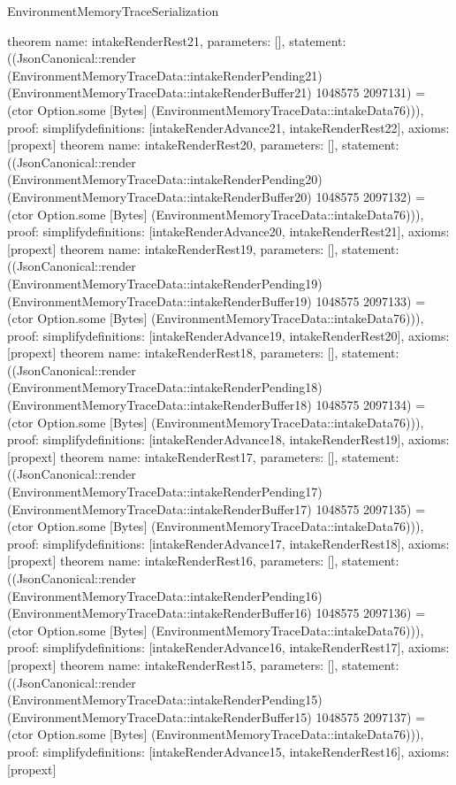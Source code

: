 \begin{lexlean}{EnvironmentMemoryTraceSerialization}
\begin{semanticmodule}
{}
theorem{
 name: intakeRenderRest21, parameters: [],
 statement: ((JsonCanonical::render (EnvironmentMemoryTraceData::intakeRenderPending21) (EnvironmentMemoryTraceData::intakeRenderBuffer21) 1048575 2097131) = (ctor Option.some [Bytes] (EnvironmentMemoryTraceData::intakeData76))), proof: simplify{definitions: [intakeRenderAdvance21, intakeRenderRest22]}, axioms: [propext]
}
theorem{
 name: intakeRenderRest20, parameters: [],
 statement: ((JsonCanonical::render (EnvironmentMemoryTraceData::intakeRenderPending20) (EnvironmentMemoryTraceData::intakeRenderBuffer20) 1048575 2097132) = (ctor Option.some [Bytes] (EnvironmentMemoryTraceData::intakeData76))), proof: simplify{definitions: [intakeRenderAdvance20, intakeRenderRest21]}, axioms: [propext]
}
theorem{
 name: intakeRenderRest19, parameters: [],
 statement: ((JsonCanonical::render (EnvironmentMemoryTraceData::intakeRenderPending19) (EnvironmentMemoryTraceData::intakeRenderBuffer19) 1048575 2097133) = (ctor Option.some [Bytes] (EnvironmentMemoryTraceData::intakeData76))), proof: simplify{definitions: [intakeRenderAdvance19, intakeRenderRest20]}, axioms: [propext]
}
theorem{
 name: intakeRenderRest18, parameters: [],
 statement: ((JsonCanonical::render (EnvironmentMemoryTraceData::intakeRenderPending18) (EnvironmentMemoryTraceData::intakeRenderBuffer18) 1048575 2097134) = (ctor Option.some [Bytes] (EnvironmentMemoryTraceData::intakeData76))), proof: simplify{definitions: [intakeRenderAdvance18, intakeRenderRest19]}, axioms: [propext]
}
theorem{
 name: intakeRenderRest17, parameters: [],
 statement: ((JsonCanonical::render (EnvironmentMemoryTraceData::intakeRenderPending17) (EnvironmentMemoryTraceData::intakeRenderBuffer17) 1048575 2097135) = (ctor Option.some [Bytes] (EnvironmentMemoryTraceData::intakeData76))), proof: simplify{definitions: [intakeRenderAdvance17, intakeRenderRest18]}, axioms: [propext]
}
theorem{
 name: intakeRenderRest16, parameters: [],
 statement: ((JsonCanonical::render (EnvironmentMemoryTraceData::intakeRenderPending16) (EnvironmentMemoryTraceData::intakeRenderBuffer16) 1048575 2097136) = (ctor Option.some [Bytes] (EnvironmentMemoryTraceData::intakeData76))), proof: simplify{definitions: [intakeRenderAdvance16, intakeRenderRest17]}, axioms: [propext]
}
theorem{
 name: intakeRenderRest15, parameters: [],
 statement: ((JsonCanonical::render (EnvironmentMemoryTraceData::intakeRenderPending15) (EnvironmentMemoryTraceData::intakeRenderBuffer15) 1048575 2097137) = (ctor Option.some [Bytes] (EnvironmentMemoryTraceData::intakeData76))), proof: simplify{definitions: [intakeRenderAdvance15, intakeRenderRest16]}, axioms: [propext]
}
\end{semanticmodule}
\end{lexlean}

